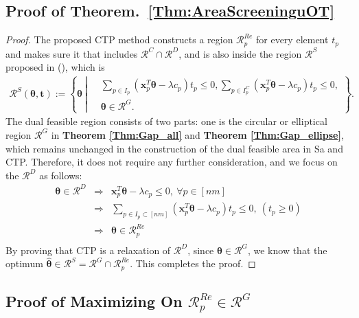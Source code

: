 \documentclass[11pt]{article}
\renewcommand{\vec}[1]{\bm{#1}}
\begin{document}
\subsection{Proof of Theorem.~\ref{Thm:AreaScreeninguOT}}
\begin{proof}
The proposed CTP method constructs a region $\mathcal{R}^{Re}_p$ for every element $t_p$ and makes sure it that includes $\mathcal{R}^{C}\cap \mathcal{R}^{D}$, and is also inside the region $\mathcal{R}^{S}$ proposed in (\cite{Yamada_NIPS_2021}), which is
\begin{equation}
\begin{split}
\mathcal{R}^{S}(\vec{\theta}, \vec{t}):= \left\{\vec{\theta} \ \left|\
\begin{aligned}
&\sum_{p\in I_p}(\vec{x}_{p}^{T}\vec{\theta} - \lambda {c}_p)t_p\leq 0, \sum_{p\in {I}^{C}_p}(\vec{x}_{p} ^{T}\vec{\theta}- \lambda {c}_p)t_p\leq 0, \\
& \vec \theta \in \mathcal{R}^{G}.
\end{aligned}
\right.
\right\}.
\end{split}
\end{equation}
The dual feasible region consists of two parts: one is the circular or elliptical region $\mathcal{R}^{G}$ in {\bf Theorem \ref{Thm:Gap_all}} and {\bf Theorem \ref{Thm:Gap_ellipse}}, which remains unchanged in the construction of the dual feasible area in Sa and CTP. Therefore, it does not require any further consideration, and we focus on the $\mathcal{R}^{D}$ as follows:
\begin{eqnarray*}
\vec \theta \in \mathcal{R}^{D} &\Longrightarrow& \vec x_p^{T}\vec\theta - \lambda c_p \leq 0, \ \forall p \in [nm]\\
&\Longrightarrow& \sum_{p \in I_p \subset [nm]} ( \vec x_p^{T}\vec\theta - \lambda c_p)t_p \leq 0, \ (t_p \geq 0)\\
&\Longrightarrow & \vec \theta \in \mathcal{R}^{Re}_p \\
\end{eqnarray*}
By proving that CTP is a relaxation of $\mathcal{R}^{D}$, since $\vec \theta \in \mathcal{R}^{G}$, we know that the optimum $\hat{\vec \theta} \in \mathcal{R}^{S} = \mathcal{R}^{G}\cap \mathcal{R}^{Re}_p$. This completes the proof.
\end{proof}


\subsection{Proof of Maximizing On $\mathcal{R}^{Re}_{p} \in \mathcal{R}^{G}$}
\end{document}
